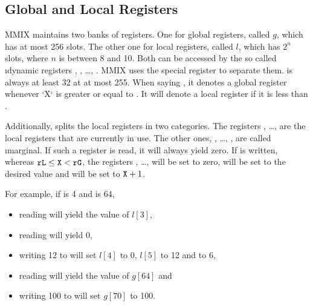 \subsection{Global and Local Registers}

MMIX maintains two banks of registers. One for global registers, called $g$, which has at most 256 slots. The other one for local registers, called $l$, which has $2^n$ slots, where $n$ is between 8 and 10. Both can be accessed by the so called \i{dynamic registers} , , \dots, . MMIX uses the special register  to separate them.  is always at least 32 at at most 255. When saying , it denotes a global register whenever `X` is greater or equal to . It will denote a local register if it is less than . \citep[pg. 22]{mmix-doc}

Additionally,  splits the local registers in two categories. The registers , \dots,  are the local registers that are currently in use. The other ones, , \dots, , are called \i{marginal}. If such a register is read, it will always yield zero. If  is written, whereas ${\tt rL} \le {\tt X} < {\tt rG}$, the registers , \dots,  will be set to zero,  will be set to the desired value and  will be set to ${\tt X} + 1$. \citep[pg. 22]{mmix-doc}

For example, if  is 4 and  is 64,
\begin{itemize}
	\item reading  will yield the value of $l[3]$,
	\item reading  will yield 0,
	\item writing 12 to  will set $l[4]$ to 0, $l[5]$ to 12 and  to 6,
	\item reading  will yield the value of $g[64]$ and
	\item writing 100 to  will set $g[70]$ to 100.
\end{itemize}

